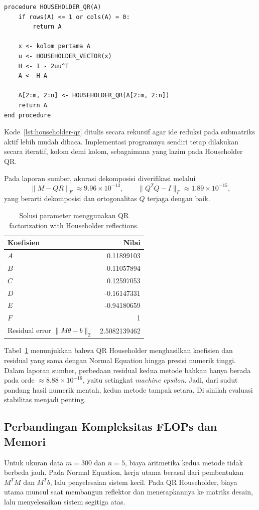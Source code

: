 \documentclass[12pt,a4paper]{article}
\begin{document}
\begin{lstlisting}[style=pseudo,caption={Pseudocode singkat QR Householder.},label={lst:householder-qr}]
procedure HOUSEHOLDER_QR(A)
    if rows(A) <= 1 or cols(A) = 0:
        return A

    x <- kolom pertama A
    u <- HOUSEHOLDER_VECTOR(x)
    H <- I - 2uu^T
    A <- H A

    A[2:m, 2:n] <- HOUSEHOLDER_QR(A[2:m, 2:n])
    return A
end procedure
\end{lstlisting}

Kode~\ref{lst:householder-qr} ditulis secara rekursif agar ide reduksi pada submatriks aktif lebih mudah dibaca. Implementasi programnya sendiri tetap dilakukan secara iteratif, kolom demi kolom, sebagaimana yang lazim pada Householder QR.

Pada laporan sumber, akurasi dekomposisi diverifikasi melalui
\[
\|M-QR\|_F \approx 9.96\times 10^{-13},
\qquad
\|Q^TQ-I\|_F \approx 1.89\times 10^{-15},
\]
yang berarti dekomposisi dan ortogonalitas \(Q\) terjaga dengan baik.

\begin{table}[h]
\centering
\caption{Solusi parameter menggunakan QR factorization with Householder reflections.}
\label{tab:star-qr-solution}
\begin{tabular}{lr}
\toprule
Koefisien & Nilai \\
\midrule
$A$ & 0.11899103 \\
$B$ & -0.11057894 \\
$C$ & 0.12597053 \\
$D$ & -0.16147331 \\
$E$ & -0.94180659 \\
$F$ & 1 \\
\midrule
Residual error $\|M\theta-b\|_2$ & 2.5082139462 \\
\bottomrule
\end{tabular}
\end{table}

Tabel~\ref{tab:star-qr-solution} menunjukkan bahwa QR Householder menghasilkan koefisien dan residual yang sama dengan Normal Equation hingga presisi numerik tinggi. Dalam laporan sumber, perbedaan residual kedua metode bahkan hanya berada pada orde \(\approx 8.88\times10^{-16}\), yaitu setingkat \emph{machine epsilon}. Jadi, dari sudut pandang hasil numerik mentah, kedua metode tampak setara. Di sinilah evaluasi stabilitas menjadi penting.

\subsection{Perbandingan Kompleksitas FLOPs dan Memori}
Untuk ukuran data \(m=300\) dan \(n=5\), biaya aritmetika kedua metode tidak berbeda jauh. Pada Normal Equation, kerja utama berasal dari pembentukan \(M^TM\) dan \(M^Tb\), lalu penyelesaian sistem kecil. Pada QR Householder, biaya utama muncul saat membangun reflektor dan menerapkannya ke matriks desain, lalu menyelesaikan sistem segitiga atas.
\end{document}
